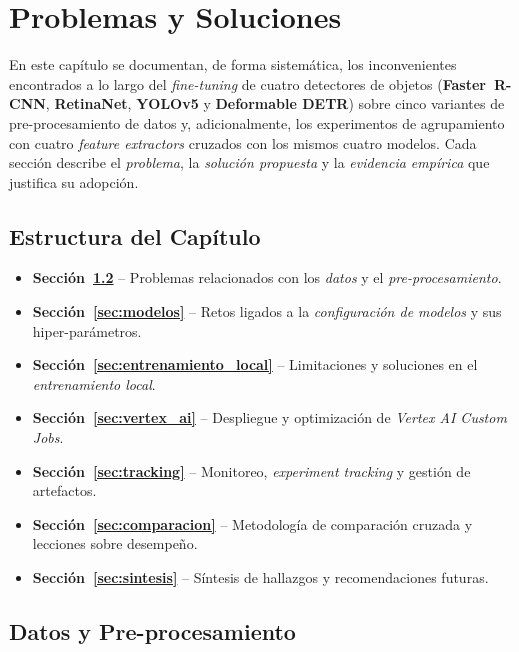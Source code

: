\chapter{Problemas y Soluciones}\label{ch:problemas_y_soluciones}
\noindent
En este capítulo se documentan, de forma sistemática, los
inconvenientes encontrados a lo largo del \emph{fine-tuning} de
cuatro detectores de objetos
(\textbf{Faster~R-CNN}, \textbf{RetinaNet}, \textbf{YOLOv5} y
\textbf{Deformable DETR}) sobre cinco variantes de pre-procesamiento
de datos y, adicionalmente, los experimentos de
agrupamiento con cuatro \emph{feature extractors} cruzados con los
mismos cuatro modelos.
Cada sección describe el \emph{problema}, la
\emph{solución propuesta} y la
\emph{evidencia empírica} que justifica su adopción.

\section{Estructura del Capítulo}
\begin{itemize}
    \item \textbf{Sección~\ref{sec:datos}} – Problemas relacionados con los \emph{datos} y el \emph{pre-procesamiento}.
    \item \textbf{Sección~\ref{sec:modelos}} – Retos ligados a la \emph{configuración de modelos} y sus hiper-parámetros.
    \item \textbf{Sección~\ref{sec:entrenamiento_local}} – Limitaciones y soluciones en el \emph{entrenamiento local}.
    \item \textbf{Sección~\ref{sec:vertex_ai}} – Despliegue y optimización de \emph{Vertex AI Custom Jobs}.
    \item \textbf{Sección~\ref{sec:tracking}} – Monitoreo, \emph{experiment tracking} y gestión de artefactos.
    \item \textbf{Sección~\ref{sec:comparacion}} – Metodología de comparación cruzada y lecciones sobre desempeño.
    \item \textbf{Sección~\ref{sec:sintesis}} – Síntesis de hallazgos y recomendaciones futuras.
\end{itemize}

\section{Datos y Pre-procesamiento}\label{sec:datos}

